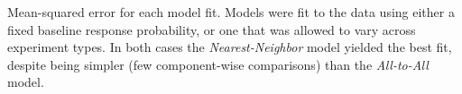 \label{fig:mses}
Mean-squared error for each model fit. Models were fit to the data using either a fixed baseline response probability, or one that was allowed to vary across experiment types.  In both cases the \textit{Nearest-Neighbor} model yielded the best fit, despite being simpler (few component-wise comparisons) than the \textit{All-to-All} model.  